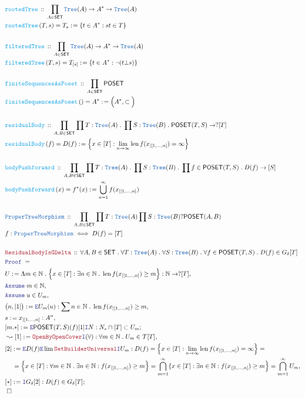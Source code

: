 \documentclass[12pt]{scrartcl}
\newcommand{\TYPE}[1]{\textcolor{NavyBlue}{\mathtt{#1}}}
\newcommand{\FUNC}[1]{\textcolor{Cerulean}{\mathtt{#1}}}
\newcommand{\LOGIC}[1]{\textcolor{Blue}{\mathtt{#1}}}
\newcommand{\THM}[1]{\textcolor{Maroon}{\mathtt{#1}}}
\renewcommand{\.}{\; . \;}
\newcommand{\de}{: \kern 0.1pc =}
\newcommand{\Act}[1]{\left( #1 \right)}
\newcommand{\Theorem}[2]{& \THM{#1} \, :: \, #2 \\ & \Proof = \\ }
\newcommand{\DeclareType}[2]{& \TYPE{#1} \, :: \, #2 \\}
\newcommand{\DefineType}[3]{& #1 : \TYPE{#2} \iff #3 \\}
\newcommand{\DeclareFunc}[2]{& \FUNC{#1} \, :: \, #2 \\}
\newcommand{\DefineNamedFunc}[4]{&  \FUNC{#1}\Act{#2} = #3 \de #4 \\}
\newcommand{\NewLine}{\\ & \kern 1pc}
\newcommand{\Page}[1]{ \begin{align*} #1 \end{align*}   }
\newcommand{\Intro}{\LOGIC{I}}
\newcommand{\Elim}{\LOGIC{E}}
\newcommand{\Nat}{\mathbb{N} }
\newcommand{\Say}[3]{& #1 \de #2 : #3, \\}
\newcommand{\Conclude}[3]{& #1 \de #2 : #3; \\}
\newcommand{\Derive}[3]{& \leadsto #1 \de #2 : #3, \\}
\newcommand{\AssumeIn}[2]{& \LOGIC{Assume} \; #1 \in #2, \\}
\newcommand{\QED}{\; \square}
\newcommand{\EndProof}{& \QED \\}
\newcommand{\Proof}{\LOGIC{Proof} \; }
\newcommand{\SET}{\mathsf{SET}}
\newcommand{\POSET}{\mathsf{POSET}}
\newcommand{\T}{\mathcal{T}}
\newcommand{\FS}[1]{{#1}{}^*}
\newcommand{\Tree}{\TYPE{Tree}}
\newcommand{\PTM}{\TYPE{ProperTreeMorphism}}
\DeclareMathOperator{\len}{len}
\newcommand{\inits}[2]{{#1}_{|\left[1,\ldots,#2\right]}}
\begin{document}
\Page{
	\DeclareFunc{rootedTree}{\prod_{A \in \SET} \Tree(A) \to \FS{A} \to \Tree(A) }
	\DefineNamedFunc{rootedTree}{T,s}{T_s}{\{ t \in \FS{A} : st \in T \}}
	\\
	\DeclareFunc{filteredTree}{\prod_{A \in \SET} \Tree(A) \to \FS{A} \to \Tree(A)}
	\DefineNamedFunc{filteredTree}{T,s}{T_{[s]}}{\{ t \in \FS{A} : \neg(t \bot s) \}}
	\\
	\DeclareFunc{finiteSequencesAsPoset}{\prod_{A \in \SET} \POSET}
	\DefineNamedFunc{finiteSequencesAsPoset}{}{\FS{A}}{\Big( \FS{A},\subset\Big)}
	\\
	\DeclareFunc{residualBody}{
		\prod_{A,B \in \SET} 
		\prod T : \Tree(A) \. 
		\prod S : \Tree(B) \. 
		\POSET(T,S) \to ?[T]
	}
	\DefineNamedFunc{residualBody}{f}{D(f)}
	{
		\Big\{ x \in [T] : \lim_{n \to \infty} \len f(\inits{x}{n}) = \infty  \Big\}
	}
	\\
	\DeclareFunc{bodyPushforward}
	{
		\prod_{A,B \in \SET} 
		\prod T : \Tree(A) \.
		\prod S : \Tree(B) \.
		\prod f \in \POSET(T,S) \.
		D(f) \to [S]
	}
	\DefineNamedFunc{bodyPushforward}{x}{f^*(x)}{\bigcup_{n=1}^\infty f(\inits{x}{n})}
	\\
	\DeclareType{ProperTreeMorphism}{\prod_{A,B \in \SET} \prod T : \Tree(A) \prod S : \Tree(B) ?\POSET(A,B) }
	\DefineType{f}{\PTM}{D(f) = [T]}
	\\
	\Theorem{ResidualBodyIsGDelta}
	{
		\forall A,B \in \SET \.
		\forall T : \Tree(A) \.
		\forall S : \Tree(B) \.
		\forall f \in \POSET(T,S) \.
		D(f) \in G_\delta[T]
	}
	\Say{U}{\Lambda m \in \Nat \. \Big\{ x \in [T] : \exists n \in \Nat \. \len f(\inits{x}{n}) \ge  m \Big\}}
	{
		\Nat \to ?[T]
	}
	\AssumeIn{m}{\Nat}
	\AssumeIn{u}{U_m}
	\Say{\big(n,[1]\big)}{\Elim U_m(u)}
	{
		\sum n \in \Nat \. \len f(\inits{x}{n}) \ge m
	}
	\Say{s}{\inits{x}{n}}{A^n}
	\Conclude{[m.*]}{\Elim \POSET(T,S)(f)[1]\Intro N}
	{
		N_s \cap [T] \subset U_m
	}
	\Derive{[1]}{\THM{OpenByOpenCover}\Intro(\forall)}{\forall m \in \Nat \. U_m \in \T[T]}
	\Say{[2]}{\Elim D(f) \Elim \lim  \THM{SetBuilderUniversal} \Intro U_m }
	{ 
		D(f) = 
		\Big\{ x \in [T] : \lim_{n \to \infty} \len f(\inits{x}{n}) = \infty \Big\} = \NewLine = 
		\Big\{ x \in [T] : \forall m \in \Nat \. \exists n \in \Nat : f(\inits{x}{n}) \ge m  \Big\}  =
		\bigcap^\infty_{m=1} \{ x \in [T] : \exists n \in \Nat : f(\inits{x}{n}) \ge m \Big\} = 
		\bigcap^\infty_{m=1} U_m
	}
	\Conclude{[*]}{\Intro G_\delta [2]}{D(f) \in G_\delta[T]}
	\EndProof
}
\end{document}
